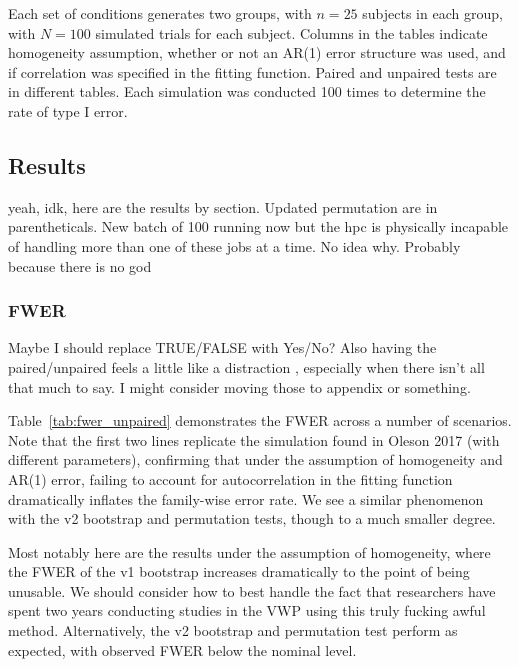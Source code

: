 \documentclass{article}
\begin{document}
Each set of conditions generates two groups, with $n = 25$ subjects in each group, with $N = 100$ simulated trials for each subject. Columns in the tables indicate homogeneity assumption, whether or not an AR(1) error structure was used, and if correlation was specified in the fitting function. Paired and unpaired tests are in different tables. Each simulation was conducted 100 times to determine the rate of type I error. 


\subsection{Results}

yeah, idk, here are the results by section. Updated permutation are in parentheticals. New batch of 100 running now but the hpc is physically incapable of handling more than one of these jobs at a time. No idea why. Probably because there is no god

\subsubsection{FWER}

Maybe I should replace TRUE/FALSE with Yes/No? Also having the paired/unpaired feels a little like a distraction , especially when there isn't all that much to say. I might consider moving those to appendix or something.


Table~\ref{tab:fwer_unpaired} demonstrates the FWER across a number of scenarios. Note that the first two lines replicate the simulation found in Oleson 2017 (with different parameters), confirming that under the assumption of homogeneity and AR(1) error, failing to account for autocorrelation in the fitting function dramatically inflates the family-wise error rate. We see a similar phenomenon with the v2 bootstrap and permutation tests, though to a much smaller degree.

Most notably here are the results under the assumption of homogeneity, where the FWER of the v1 bootstrap increases dramatically to the point of being unusable. We should consider how to best handle the fact that researchers have spent two years conducting studies in the VWP using this truly fucking awful method. Alternatively, the v2 bootstrap and permutation test perform as expected, with observed FWER below the nominal level.
\end{document}
